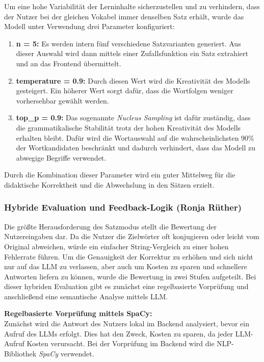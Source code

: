 Um eine hohe Variabilität der Lerninhalte sicherzustellen und zu verhindern, dass der Nutzer bei der gleichen Vokabel immer denselben Satz erhält, wurde das Modell unter Verwendung drei Parameter konfiguriert:
\begin{enumerate}
    \item \textbf{n = 5:} Es werden intern fünf verschiedene Satzvarianten generiert. Aus dieser Auswahl wird dann mittels einer Zufallsfunktion ein Satz extrahiert und an das Frontend übermittelt.
    \item \textbf{temperature = 0.9:} Durch diesen Wert wird die Kreativität des Modells gesteigert. Ein höherer Wert sorgt dafür, dass die Wortfolgen weniger vorhersehbar gewählt werden.
    \item \textbf{top\_p = 0.9:} Das sogenannte \textit{Nucleus Sampling} ist dafür zuständig, dass die grammatikalische Stabilität trotz der hohen Kreativität des Modells erhalten bleibt. Dafür wird die Wortauswahl auf die wahrscheinlichsten 90\% der Wortkandidaten beschränkt und dadurch verhindert, dass das Modell zu abwegige Begriffe verwendet.
\end{enumerate}

Durch die Kombination dieser Parameter wird ein guter Mittelweg für die didaktische Korrektheit und die Abwechslung in den Sätzen erzielt.

\subsubsection{Hybride Evaluation und Feedback-Logik (Ronja Rüther)}
Die größte Herausforderung des Satzmodus stellt die Bewertung der Nutzereingaben dar. Da die Nutzer die Zielwörter oft konjugieren oder leicht vom Original abweichen, würde ein einfacher String-Vergleich zu einer hohen Fehlerrate führen.
Um die Genauigkeit der Korrektur zu erhöhen und sich nicht nur auf das LLM zu verlassen, aber auch um Kosten zu sparen und schnellere Antworten liefern zu können, wurde die Bewertung in zwei Stufen aufgeteilt.
Bei dieser hybriden Evaluation gibt es zunächst eine regelbasierte Vorprüfung und anschließend eine semantische Analyse mittels LLM.

\textbf{Regelbasierte Vorprüfung mittels SpaCy:} \\
Zunächst wird die Antwort des Nutzers lokal im Backend analysiert, bevor ein Aufruf des LLMs erfolgt. Dies hat den Zweck, Kosten zu sparen, da jeder LLM-Aufruf Kosten verursacht.
Bei der Vorprüfung im Backend wird die NLP-Bibliothek \textit{SpaCy} verwendet.

